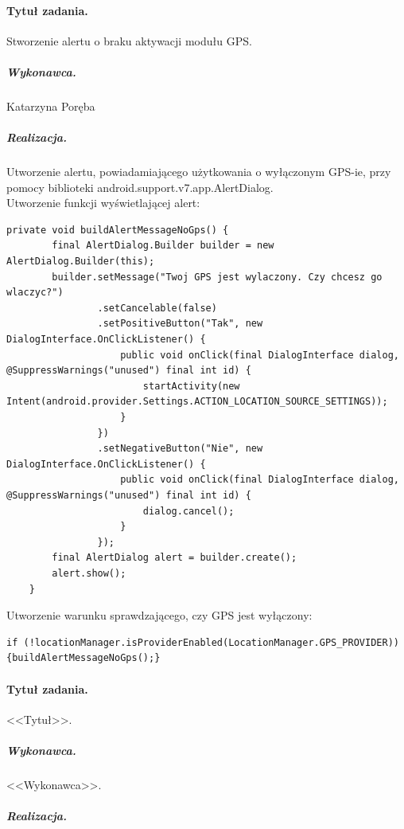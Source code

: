 \documentclass[a4paper]{article}
\begin{document}
\paragraph{Tytuł zadania.} Stworzenie alertu o braku aktywacji modułu GPS.
\subparagraph{Wykonawca.} Katarzyna Poręba
\subparagraph{Realizacja.} Utworzenie alertu, powiadamiającego użytkowania o wyłączonym GPS-ie, przy pomocy biblioteki android.support.v7.app.AlertDialog. \\
Utworzenie funkcji wyświetlającej alert:
\begin{lstlisting}[style=java]
private void buildAlertMessageNoGps() {
        final AlertDialog.Builder builder = new AlertDialog.Builder(this);
        builder.setMessage("Twoj GPS jest wylaczony. Czy chcesz go wlaczyc?")
                .setCancelable(false)
                .setPositiveButton("Tak", new DialogInterface.OnClickListener() {
                    public void onClick(final DialogInterface dialog, @SuppressWarnings("unused") final int id) {
                        startActivity(new Intent(android.provider.Settings.ACTION_LOCATION_SOURCE_SETTINGS));
                    }
                })
                .setNegativeButton("Nie", new DialogInterface.OnClickListener() {
                    public void onClick(final DialogInterface dialog, @SuppressWarnings("unused") final int id) {
                        dialog.cancel();
                    }
                });
        final AlertDialog alert = builder.create();
        alert.show();
    }
\end{lstlisting}
Utworzenie warunku sprawdzającego, czy GPS jest wyłączony:
\begin{lstlisting}[style=java]
if (!locationManager.isProviderEnabled(LocationManager.GPS_PROVIDER)) {buildAlertMessageNoGps();}
\end{lstlisting}

\paragraph{Tytuł zadania.} <<Tytuł>>.
\subparagraph{Wykonawca.} <<Wykonawca>>.
\subparagraph{Realizacja.}
\end{document}

